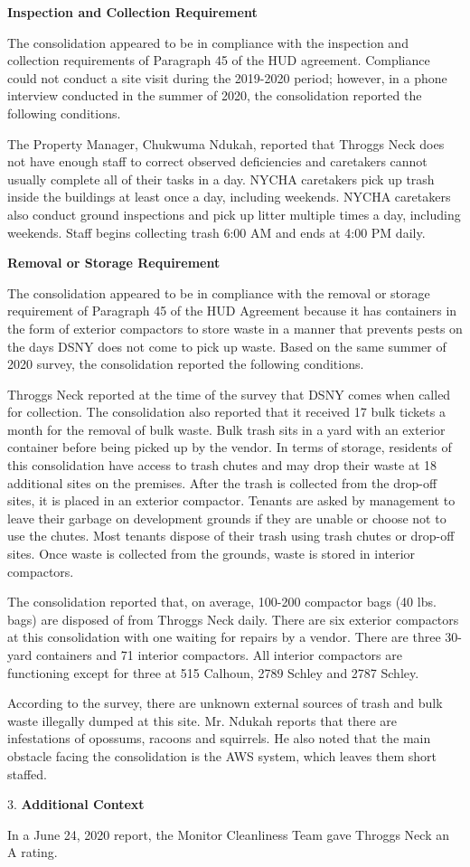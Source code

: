 

\textbf{Inspection and Collection Requirement}

The consolidation appeared to be in compliance with the inspection and collection requirements of Paragraph 45 of the HUD agreement. Compliance could not conduct a site visit during the 2019-2020 period; however, in a phone interview conducted in the summer of 2020, the consolidation reported the following conditions.

The Property Manager, Chukwuma Ndukah, reported that Throggs Neck does not have enough staff to correct observed deficiencies and caretakers cannot usually complete all of their tasks in a day. NYCHA caretakers pick up trash inside the buildings at least once a day, including weekends. NYCHA caretakers also conduct ground inspections and pick up litter multiple times a day, including weekends. Staff begins collecting trash 6:00 AM and ends at 4:00 PM daily.

\textbf{Removal or Storage Requirement}

The consolidation appeared to be in compliance with the  removal or storage requirement of Paragraph  45 of the HUD Agreement because it has containers in the form of exterior compactors to store waste in a manner that prevents pests on the days DSNY does not come to pick up waste. Based on the same summer of  2020 survey, the consolidation reported the following conditions.

Throggs Neck reported at the time of the survey that DSNY comes when called for collection. The consolidation also reported that it received 17 bulk tickets a month for the removal of bulk waste. Bulk trash sits in a yard with an exterior container before being picked up by the vendor. In terms of storage, residents of this consolidation have access to trash chutes and may drop their waste at 18 additional sites on the premises. After the trash is collected from the drop-off sites, it is placed in an exterior compactor. Tenants are asked by management to leave their garbage on development grounds if they are unable or choose not to use the chutes. Most tenants dispose of their trash using trash chutes or drop-off sites. Once waste is collected from the grounds, waste is stored in interior compactors. 

The consolidation reported that, on average, 100-200 compactor bags (40 lbs. bags) are disposed of from Throggs Neck daily. There are six exterior compactors at this consolidation with one waiting for repairs by a vendor. There are three 30-yard containers and 71 interior compactors. All interior compactors are functioning except for three at 515 Calhoun, 2789 Schley and 2787 Schley.

According to the survey, there are unknown external sources of trash and bulk waste illegally dumped at this site. Mr. Ndukah reports that there are infestations of opossums, racoons and squirrels. He also noted that the main obstacle facing the consolidation is the AWS system, which leaves them short staffed.

3. \textbf{Additional Context} 

In a June 24, 2020 report, the Monitor Cleanliness Team gave Throggs Neck an A rating. 